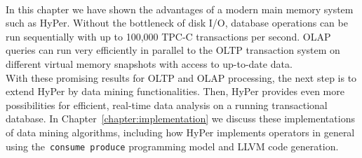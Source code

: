 \\
In this chapter we have shown the advantages of a modern main memory system such as HyPer. Without the bottleneck of disk I/O, database operations can be run sequentially with up to 100,000 TPC-C transactions per second. OLAP queries can run very efficiently in parallel to the OLTP transaction system on different virtual memory snapshots with access to up-to-date data. 
\\
With these promising results for OLTP and OLAP processing, the next step is to extend HyPer by data mining functionalities. Then, HyPer provides even more possibilities for efficient, real-time data analysis on a running transactional database. In Chapter~\ref{chapter:implementation} we discuss these implementations of data mining algorithms, including how HyPer implements operators in general using the~\texttt{consume produce} programming model and LLVM code generation. 



